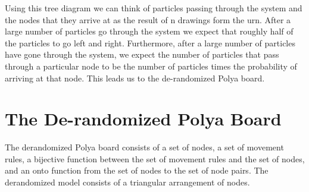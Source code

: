 \documentclass[11pt]{article}
\begin{document}

Using this tree diagram we can think of particles passing through the system and the nodes that they arrive at as the result of n drawings form the urn. After a large number of particles go through the system we expect that roughly half of the particles to go left and right. Furthermore, after a large number of particles have gone through the system, we expect the number of particles that pass through a particular node to be the number of particles times the probability of arriving at that node. This leads us to the de-randomized Polya board. 

\section{The De-randomized Polya Board}
The derandomized Polya board consists of a set of nodes, a set of movement rules, a bijective function between the set of movement rules and the set of nodes, and an onto function from the set of nodes to the set of node pairs. The derandomized model consists of a triangular arrangement of nodes.
 
\end{document}
